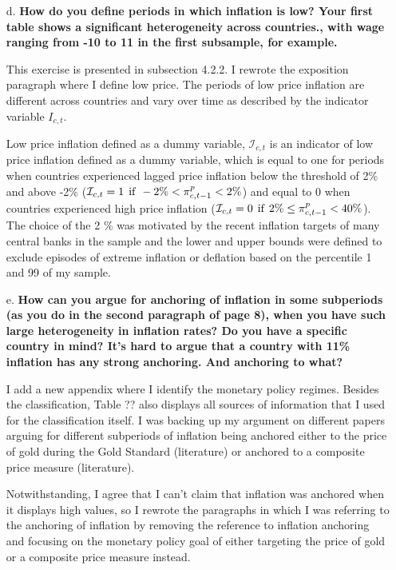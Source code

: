 \documentclass[12pt]{article}
\begin{document}
\begin{enumerate}
\begin{itemize}
    \item[d.] \textbf{How do you define periods in which inflation is low? Your first table shows a significant heterogeneity across countries., with wage ranging from -10 to 11 in the first subsample, for example.}

This exercise is presented in subsection 4.2.2. I rewrote the exposition paragraph where I define low price. The periods of low price inflation are different across countries and vary over time as described by the indicator variable $I_{c,t}$.

Low price inflation defined as a dummy variable, $\mathcal{I}_{c,t}$ is an indicator of low price inflation defined as a dummy variable, which is equal to one for periods when countries experienced lagged price inflation below the threshold of 2\% and above -2\% ($\mathcal{I}_{c,t} = 1 \hspace{1ex} \text{if} \hspace{1ex} -2\% < \pi^p_{c,t-1} < 2\%$) and equal to 0 when countries experienced high price inflation ($\mathcal{I}_{c,t} = 0 \hspace{1ex} \text{if} \hspace{1ex} 2\% \leq \pi^p_{c,t-1} < 40\%$). The choice of the 2 \% was motivated by the recent inflation targets of many central banks in the sample and the lower and upper bounds were defined to exclude episodes of extreme inflation or deflation based on the percentile 1 and 99 of my sample.


    \item[e.] \textbf{How can you argue for anchoring of inflation in some subperiods (as you do in the second paragraph of page 8), when you have such large heterogeneity in inflation rates? Do you have a specific country in mind? It's hard to argue that a country with 11\% inflation has any strong anchoring. And anchoring to what?}

I add a new appendix where I identify the monetary policy regimes. Besides the classification, Table ?? also displays all sources of information that I used for the classification itself. I was backing up my argument on different papers arguing for different subperiods of inflation being anchored either to the price of gold during the Gold Standard (literature) or anchored to a composite price measure (literature).

Notwithstanding, I agree that I can't claim that inflation was anchored when it displays high values, so I rewrote the paragraphs in which I was referring to the anchoring of inflation by removing the reference to inflation anchoring and focusing on the monetary policy goal of either targeting the price of gold or a composite price measure instead.



\end{itemize}
\end{enumerate}
\end{document}
